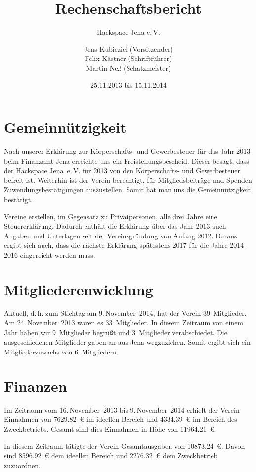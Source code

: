 \documentclass[ngerman]{scrartcl}
\title{Rechenschaftsbericht}
\subtitle{Hackspace Jena e.\,V.}
\author{%
	Jens Kubieziel (Vorsitzender)\\
    Felix Kästner (Schriftführer)\\
	Martin Neß (Schatzmeister)
}
\date{25.11.2013 bis 15.11.2014}
\begin{document}
\maketitle{}

\tableofcontents{}

\newpage{}

\section{Gemeinnützigkeit}

Nach unserer Erklärung zur Körperschafts- und Gewerbesteuer für das Jahr 2013 beim Finanzamt Jena
erreichte uns ein Freistellungsbescheid.
Dieser besagt, dass der Hackspace Jena~e.\,V. für 2013 von den Körperschafts- und Gewerbesteuer befreit ist. Weiterhin ist der Verein berechtigt, für Mitgliedsbeiträge und Spenden Zuwendungsbestätigungen auszustellen.
Somit hat man uns die Gemeinnützigkeit bestätigt.

Vereine erstellen, im Gegensatz zu Privatpersonen, alle drei Jahre eine Steuererklärung.
Dadurch enthält die Erklärung über das Jahr 2013 auch Angaben und Unterlagen seit der Vereinsgründung von Anfang 2012.
Daraus ergibt sich auch, dass die nächste Erklärung spätestens 2017 für die Jahre 2014--2016 eingereicht werden muss.

\section{Mitgliederenwicklung}

Aktuell, d.\,h. zum Stichtag am  9.\,November~2014, hat der Verein 39~Mitglieder. Am 24.\,November~2013 waren es 33~Mitglieder.
In diesem Zeitraum von einem Jahr haben wir 9~Mitglieder begrüßt und 3~Mitglieder verabschiedet. Die ausgeschiedenen Mitglieder gaben an aus Jena wegzuziehen.
Somit ergibt sich ein Mitgliederzuwachs von 6~Mitgliedern.

\section{Finanzen}

Im Zeitraum vom 16.\,November~2013 bis 9.\,November~2014 erhielt der Verein Einnahmen von \num{7629,82}~\euro{} im ideellen Bereich und \num{4334,39}~\euro{} im Bereich des Zweckbetriebs.
Gesamt sind dies Einnahmen in Höhe von \num{11964,21}~\euro{}.


In diesem Zeitraum tätigte der Verein Gesamtausgaben von \num{10873,24}~\euro{}. Davon sind \num{8596,92}~\euro{} dem ideellen Bereich und \num{2276,32}~\euro{}  dem Zweckbetrieb zuzuordnen.
\end{document}
